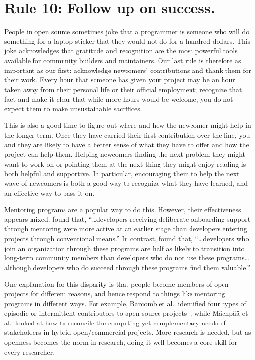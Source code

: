 \documentclass[10pt,letterpaper]{article}
\newcommand{\rulemajor}[1]{\section*{#1}}
\begin{document}
\rulemajor{Rule 10: Follow up on success.}

People in open source sometimes joke that
a programmer is someone who will do something for a laptop sticker
that they would not do for a hundred dollars.
This joke acknowledges that gratitude and recognition are the most powerful tools available for community builders and maintainers.
Our last rule is therefore as important as our first:
acknowledge newcomers' contributions and thank them for their work.
Every hour that someone has given your project may be an hour taken away from their personal life
or their official employment;
recognize that fact
and make it clear that while more hours would be welcome,
you do not expect them to make unsustainable sacrifices.

This is also a good time to figure out where and how the newcomer might help in the longer term.
Once they have carried their first contribution over the line,
you and they are likely to have a better sense of what they have to offer
and how the project can help them.
Helping newcomers finding the next problem they might want to work on
or pointing them at the next thing they might enjoy reading
is both helpful and supportive.
In particular,
encouraging them to help the next wave of newcomers
is both a good way to recognize what they have learned,
and an effective way to pass it on.

Mentoring programs are a popular way to do this.
However,
their effectiveness appears mixed.
\cite{fagerholm2014} found that,
``{\ldots}developers receiving deliberate onboarding support through mentoring
were more active at an earlier stage than developers entering projects through conventional means.''
In contrast,
\cite{labuschagne2015} found that,
``{\ldots}developers who join an organization through these programs
are half as likely to transition into long-term community members
than developers who do not use these programs{\ldots}
although developers who do succeed through these programs find them valuable.''

One explanation for this disparity is that people become members of open projects for different reasons,
and hence respond to things like mentoring programs in different ways.
For example,
Barcomb et al.\ identified four types of episodic or intermittent contributors to open source projects~\cite{barcomb2019},
while M\"{a}enp\"{a}\"{a} et al.\ looked at how to reconcile
the competing yet complementary needs of stakeholders in hybrid open/commercial projects.
More research is needed,
but as openness becomes the norm in research,
doing it well becomes a core skill for every researcher.
\end{document}
